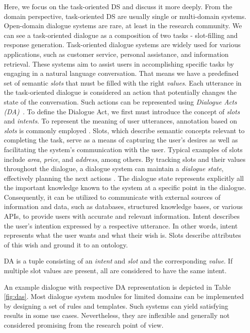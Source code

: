 Here, we focus on the task-oriented DS and discuss it more deeply.
From the domain perspective, task-oriented DS are usually single or multi-domain systems.
Open-domain dialogue systems are rare, at least in the research community.
We can see a task-oriented dialogue as a composition of two tasks - slot-filling and response generation.
Task-oriented dialogue systems are widely used for various applications, such as customer service, personal assistance, and information retrieval. These systems aim to assist users in accomplishing specific tasks by engaging in a natural language conversation. 
That means we have a predefined set of semantic \textit{slots} that must be filled with the right \textit{values}.
Each utterance in the task-oriented dialogue is considered an action that potentially changes the state of the conversation.
Such actions can be represented using \textit{Dialogue Acts (DA)}~\cite{core1997coding}.
To define the Dialogue Act, we first must introduce the concept of \emph{slots} and \emph{intents}.
To represent the meaning of user utterances, annotation based on \emph{slots} is commonly employed \cite{young_pomdp-based_2013}. Slots, which describe semantic concepts relevant to completing the task, serve as a means of capturing the user's desires as well as facilitating the system's communication with the user. Typical examples of slots include \emph{area}, \emph{price}, and \emph{address}, among others. By tracking slots and their values throughout the dialogue, a dialogue system can maintain a \emph{dialogue state}, effectively planning the next actions \cite{williams2013dialog}. The dialogue state represents explicitly all the important knowledge known to the system at a specific point in the dialogue. Consequently, it can be utilized to communicate with external sources of information and data, such as databases, structured knowledge bases, or various APIs, to provide users with accurate and relevant information.
Intent describes the user's intention expressed by a respective utterance.
In other words, intent represents what the user wants and what their wish is.
Slots describe attributes of this wish and ground it to an ontology.

DA is a tuple consisting of an \textit{intent} and \textit{slot} and the corresponding \textit{value}.
If multiple slot values are present, all are considered to have the same intent.

An example dialogue with respective DA representation is depicted in Table \ref{fig:das}.
Most dialogue system modules for limited domains can be implemented by designing a set of rules and templates.
Such systems can yield satisfying results in some use cases.
Nevertheless, they are inflexible and generally not considered promising from the research point of view.

